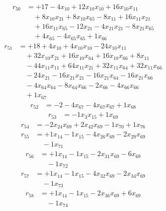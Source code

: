 \[\begin{aligned}
r_{50} &= + 17 - 4 x_{10} + 12 x_{10} x_{10} + 16 x_{10} x_{11} \\
 &\quad + 8 x_{10} x_{21} + 8 x_{10} x_{65} - 8 x_{11} + 16 x_{11} x_{21} \\
 &\quad + 16 x_{11} x_{65} - 12 x_{21} - 4 x_{21} x_{21} - 8 x_{21} x_{65} \\
 &\quad + 4 x_{65} - 4 x_{65} x_{65} + 1 x_{66}
\end{aligned}\]
\[\begin{aligned}
r_{51} &= + 18 + 4 x_{10} + 4 x_{10} x_{10} - 24 x_{10} x_{11} \\
 &\quad + 32 x_{10} x_{21} + 16 x_{10} x_{64} + 16 x_{10} x_{66} + 8 x_{11} \\
 &\quad - 44 x_{11} x_{11} + 64 x_{11} x_{21} + 32 x_{11} x_{64} + 32 x_{11} x_{66} \\
 &\quad - 24 x_{21} - 16 x_{21} x_{21} - 16 x_{21} x_{64} - 16 x_{21} x_{66} \\
 &\quad - 4 x_{64} x_{64} - 8 x_{64} x_{66} - 2 x_{66} - 4 x_{66} x_{66} \\
 &\quad + 1 x_{67}
\end{aligned}\]
\[\begin{aligned}
r_{52} &= - 2 - 4 x_{67} - 4 x_{67} x_{67} + 1 x_{68}
\end{aligned}\]
\[\begin{aligned}
r_{53} &= - 1 x_{3} x_{15} + 1 x_{69}
\end{aligned}\]
\[\begin{aligned}
r_{54} &= - 2 x_{24} x_{69} + 2 x_{42} x_{69} - 1 x_{70} + 1 x_{76}
\end{aligned}\]
\[\begin{aligned}
r_{55} &= + 1 x_{14} - 1 x_{15} - 4 x_{26} x_{69} - 2 x_{29} x_{69} \\
 &\quad - 1 x_{71}
\end{aligned}\]
\[\begin{aligned}
r_{56} &= + 1 x_{14} - 1 x_{15} - 2 x_{31} x_{69} - 6 x_{69} \\
 &\quad - 1 x_{72}
\end{aligned}\]
\[\begin{aligned}
r_{57} &= + 1 x_{14} - 1 x_{15} - 4 x_{32} x_{69} - 2 x_{34} x_{69} \\
 &\quad - 1 x_{73}
\end{aligned}\]
\[\begin{aligned}
r_{58} &= + 1 x_{14} - 1 x_{15} - 2 x_{36} x_{69} + 6 x_{69} \\
 &\quad - 1 x_{74}
\end{aligned}\]
